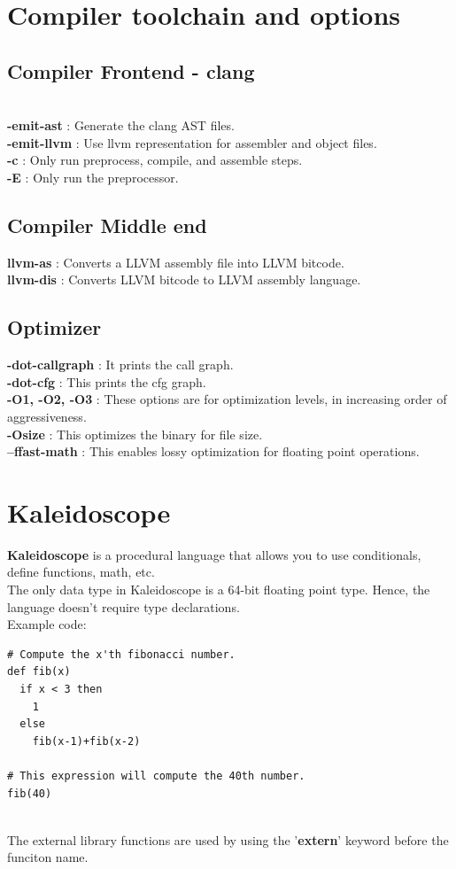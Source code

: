 \documentclass{article}
\begin{document}
\section{Compiler toolchain and options}
\subsection{Compiler Frontend - clang}\\
\textbf{-emit-ast} : Generate the clang AST files.\\
\textbf{-emit-llvm} : Use llvm representation for assembler and object files.\\
\textbf{-c} : Only run preprocess, compile, and assemble steps.\\
\textbf{-E} : Only run the preprocessor.\\

\subsection{Compiler Middle end}
\textbf{llvm-as} : Converts a LLVM assembly file into LLVM bitcode.\\
\textbf{llvm-dis} : Converts LLVM bitcode to LLVM assembly language.

\subsection{Optimizer}
\textbf{-dot-callgraph} : It prints the call graph.\\
\textbf{-dot-cfg} : This prints the cfg graph.\\
\textbf{-O1, -O2, -O3} : These options are for optimization levels, in increasing order of aggressiveness.\\
\textbf{-Osize} : This optimizes the binary for file size.\\
\textbf{--ffast-math} : This enables lossy optimization for floating point operations.

\section{Kaleidoscope}
\textbf{Kaleidoscope} is a procedural language that allows you to use conditionals, define functions, math, etc.\\
The only data type in Kaleidoscope is a 64-bit floating point type. Hence, the language doesn't require type declarations.\\
Example code:
\begin{verbatim}
# Compute the x'th fibonacci number.
def fib(x)
  if x < 3 then
    1
  else
    fib(x-1)+fib(x-2)

# This expression will compute the 40th number.
fib(40)
\end{verbatim}
\\
The external library functions are used by using the '\textbf{extern}' keyword before the funciton name.
\end{document}
